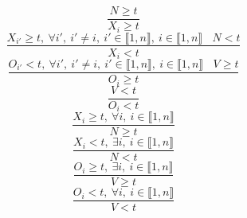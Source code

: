 $$\frac{N \geq t}{X_{i} \geq t}$$ $$\frac{X_{i'} \geq t,~\forall i',~i' \neq i,~i' \in \llbracket1,n\rrbracket,~i \in \llbracket1,n\rrbracket~~~~N<t}{X_{i}<t}$$ $$\frac{O_{i'}<t,~\forall i',~i' \neq i,~i' \in \llbracket1,n\rrbracket,~i \in \llbracket1,n\rrbracket~~~~V \geq t}{O_{i} \geq t}$$ $$\frac{V<t}{O_{i}<t}$$ $$\frac{X_{i} \geq t,~\forall i,~i \in \llbracket1,n\rrbracket}{N \geq t}$$ $$\frac{X_{i}<t,~\exists i,~i \in \llbracket1,n\rrbracket}{N<t}$$ $$\frac{O_{i} \geq t,~\exists i,~i \in \llbracket1,n\rrbracket}{V \geq t}$$ $$\frac{O_{i}<t,~\forall i,~i \in \llbracket1,n\rrbracket}{V<t}$$ 
